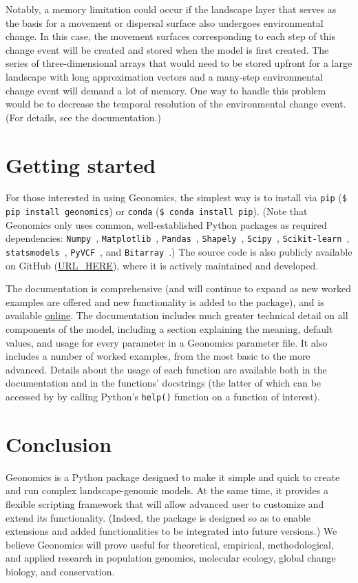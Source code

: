 ﻿\documentclass{article}
\begin{document}
Notably, a memory limitation could occur if the landscape layer that serves as the basis
for a movement or dispersal surface also undergoes environmental change.
In this case, the movement surfaces corresponding to each step of this
change event will be created and stored when the model is first created.
The series of three-dimensional arrays that would need to be stored upfront
for a large landscape with long approximation vectors and a many-step environmental change
event will demand a lot of memory.
One way to handle this problem would be to decrease the temporal resolution of
the environmental change event. (For details, see the documentation.)


\section{Getting started}
For those interested in using Geonomics, the simplest way is to install
via \texttt{pip} (\texttt{\$ pip install geonomics})
or \texttt{conda} (\texttt{\$ conda install pip}).
(Note that Geonomics only uses common, well-established Python packages
as required dependencies:
\texttt{Numpy}~\cite{numpy},
\texttt{Matplotlib}~\cite{matplotlib},
\texttt{Pandas}~\cite{pandas},
\texttt{Shapely}~\cite{shapely},
\texttt{Scipy}~\cite{scipy},
\texttt{Scikit-learn}~\cite{scikit-learn},
\texttt{statsmodels}~\cite{statsmodels},
\texttt{PyVCF}~\cite{pyvcf},
and \texttt{Bitarray}~\cite{bitarray}.)
The source code is also publicly available on GitHub (\url{URL\_HERE}),
where it is actively maintained and developed.

The documentation is comprehensive (and will continue to expand as new worked examples
are offered and new functionality is added to the package), and is available
\href{http://htmlpreview.github.io/?https://github.com/drewhart/geonomics\_docs/blob/master/built/doc.html}{online}.
The documentation includes much greater technical detail on all components of the model,
including a section explaining the meaning, default values, and usage
for every parameter in a Geonomics parameter file.
It also includes a number of worked examples, from the most basic to the more advanced.
Details about the usage of each function are available both in the documentation
and in the functions' docstrings
(the latter of which can be accessed by by calling Python's
\texttt{help()} function on a function of interest).


\section{Conclusion}
Geonomics is a Python package designed to make it simple and quick to create and run
complex landscape-genomic models. At the same time, it provides a flexible scripting framework that
will allow advanced user to customize and extend its functionality.
(Indeed, the package is designed so as to enable extensions and added functionalities
to be integrated into future versions.)
We believe Geonomics will prove useful for theoretical, empirical, methodological, and applied
research in population genomics, molecular ecology, global change biology, and conservation. 
\end{document}
